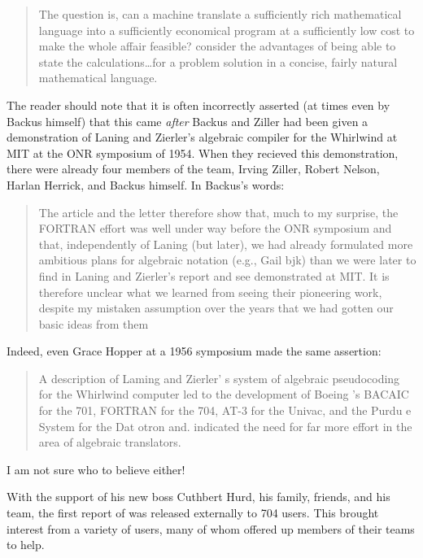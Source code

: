 \begin{quotation}
    The question is, can a machine translate a sufficiently rich mathematical
    language into a sufficiently economical program at a sufficiently low cost to
    make the whole affair feasible?  consider the advantages of being able to state
    the calculations\dots for a problem solution in a concise, fairly natural
    mathematical language.
\end{quotation}

The reader should note that it is often incorrectly asserted (at times even by
Backus himself\cite{Backus_1980_Programming_in_America_in_1950s}) that this
came \textit{after} Backus and Ziller had been given a demonstration of Laning
and Zierler's algebraic compiler for the Whirlwind at MIT at the ONR symposium
of 1954. When they recieved this demonstration, there were already four members
of the \FTN{} team, Irving Ziller, Robert Nelson, Harlan Herrick, and Backus
himself. In Backus's words\cite{Backus_1980_Programming_in_America_in_1950s}:

\begin{quotation}
    The article and the letter therefore show that, much to my surprise, the
    FORTRAN effort was well under way before the ONR symposium and that,
    independently of Laning (but later), we had already formulated more ambitious
    plans for algebraic notation (e.g., Gail bjk) than we were later to find in
    Laning and Zierler's report and see demonstrated at MIT. It is therefore
    unclear what we learned from seeing their pioneering work, despite my mistaken
    assumption over the years that we had gotten our basic ideas from them
\end{quotation}

Indeed, even Grace Hopper at a 1956 symposium made the same assertion:

\begin{quotation}
    A description of Laming and Zierler' s system of algebraic pseudocoding for
    the Whirlwind computer led to the development of Boeing 's BACAIC for the 701,
    FORTRAN for the 704, AT-3 for the Univac, and the Purdu e System for the Dat
    otron and. indicated the need for far more effort in the area of algebraic
    translators.
    \cite{Knuth_TrabbPardo_1976_Early_Development}
\end{quotation}

I am not sure who to believe either!

With the support of his new boss Cuthbert Hurd, his family, friends, and his
team, the first report of \FTN{} was released externally to 704 users. This
brought interest from a variety of users, many of whom offered up members of
their teams to help.

